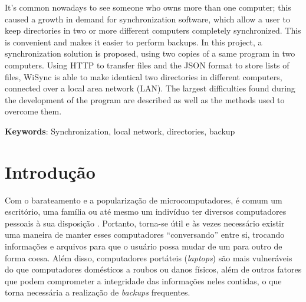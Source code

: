 \documentclass[12pt,a4paper]{ufpr}
\begin{document}
It's common nowadays to see someone who owns more than one computer; this caused a growth in demand for synchronization software, which allow a user to keep directories in two or more different computers completely synchronized.
This is convenient and makes it easier to perform backups.
In this project, a synchronization solution is proposed, using two copies of a same program in two computers.
Using HTTP to transfer files and the JSON format to store lists of files, WiSync is able to make identical two directories in different computers, connected over a local area network (LAN).
The largest difficulties found during the development of the program are described as well as the methods used to overcome them.

\noindent \textbf{Keywords}: Synchronization, local network, directories, backup

\newpage





\chapter{Introdução}
\label{introducao}
Com o barateamento e a popularização de microcomputadores, é comum um escritório, uma família ou até mesmo um indivíduo ter diversos computadores pessoais à sua disposição \cite{multiplepcs}.
Portanto, torna-se útil e às vezes necessário existir uma maneira de manter esses computadores ``conversando'' entre si, trocando informações e arquivos para que o usuário possa mudar de um para outro de forma coesa.
Além disso, computadores portáteis (\textit{laptops}) são mais vulneráveis do que computadores domésticos a roubos ou danos físicos, além de outros fatores que podem comprometer a integridade das informações neles contidas, o que torna necessária a realização de \textit{backups} frequentes.
\end{document}
